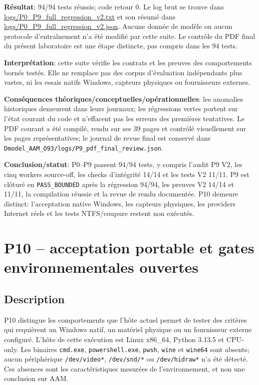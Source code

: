 \documentclass[11pt,a4paper,oneside]{report}
\begin{document}
\textbf{Résultat}: 94/94 tests réussis; code retour 0. Le log brut se trouve dans \url{logs/P0_P9_full_regression_v2.txt} et son résumé dans \url{logs/P0_P9_full_regression_v2.json}. Aucune donnée de modèle ou aucun protocole d'entraînement n'a été modifié par cette suite. Le contrôle du PDF final du présent laboratoire est une étape distincte, pas compris dans les 94 tests.

\textbf{Interprétation}: cette suite vérifie les contrats et les preuves des comportements bornés testés. Elle ne remplace pas des corpus d'évaluation indépendants plus vastes, ni les essais natifs Windows, capteurs physiques ou fournisseurs externes.

\textbf{Conséquences théoriques/conceptuelles/opérationnelles}: les anomalies historiques demeurent dans leurs journaux; les régressions vertes portent sur l'état courant du code et n'effacent pas les erreurs des premières tentatives. Le PDF courant a été compilé, rendu sur ses 39 pages et contrôlé visuellement sur les pages représentatives; le journal de revue final est conservé dans \texttt{Dmodel\_AAM\_O93/logs/P9\_pdf\_final\_review.json}.

\textbf{Conclusion/statut}: P0--P9 passent 94/94 tests, y compris l’audit P9 V2, les cinq workers source-off, les checks d’intégrité 14/14 et les tests V2 11/11. P9 est clôturé en \texttt{PASS\_BOUNDED} après la régression 94/94, les preuves V2 14/14 et 11/11, la compilation réussie et la revue de rendu documentée. P10 demeure distinct: l’acceptation native Windows, les capteurs physiques, les providers Internet réels et les tests NTFS/coupure restent non exécutés.



\section{P10 -- acceptation portable et gates environnementales ouvertes}
\label{sec:p10-acceptation}

\subsection*{Description}
P10 distingue les comportements que l'hôte actuel permet de tester des critères qui requièrent un Windows natif, un matériel physique ou un fournisseur externe configuré. L'hôte de cette exécution est Linux x86\_64, Python 3.13.5 et CPU-only. Les binaires \texttt{cmd.exe}, \texttt{powershell.exe}, \texttt{pwsh}, \texttt{wine} et \texttt{wine64} sont absents; aucun périphérique \texttt{/dev/video*}, \texttt{/dev/snd/*} ou \texttt{/dev/hidraw*} n'a été détecté. Ces absences sont les caractéristiques mesurées de l'environnement, et non une conclusion sur AAM.
\end{document}

